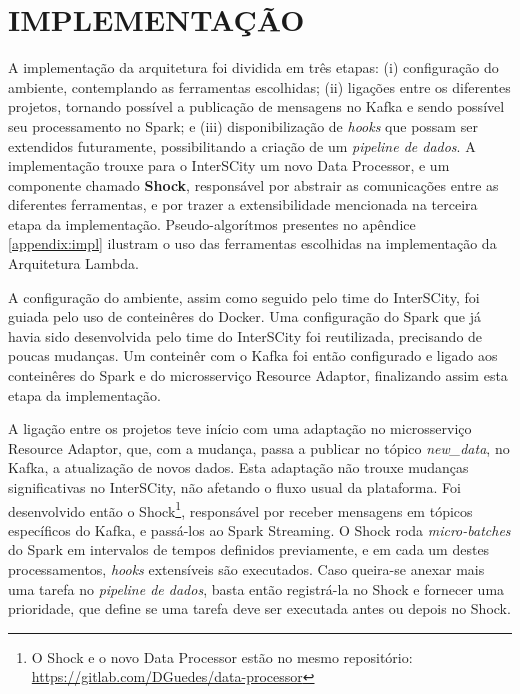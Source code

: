 \section{IMPLEMENTAÇÃO}

A implementação da arquitetura foi dividida em três etapas: (i)
configuração do ambiente, contemplando as ferramentas escolhidas; (ii)
ligações entre os diferentes projetos, tornando possível a publicação de
mensagens no Kafka e sendo possível seu processamento no Spark; e (iii)
disponibilização de \textit{hooks} que possam ser extendidos futuramente,
possibilitando a criação de um \textit{pipeline de dados}. A implementação
trouxe para o InterSCity um novo Data Processor, e um componente chamado
\textbf{Shock}, responsável por abstrair as comunicações entre as diferentes
ferramentas, e por trazer a extensibilidade mencionada na terceira etapa da
implementação. Pseudo-algorítmos presentes no apêndice \ref{appendix:impl}
ilustram o uso das ferramentas escolhidas na implementação da Arquitetura
Lambda.

A configuração do ambiente, assim como seguido pelo time do InterSCity, foi
guiada pelo uso de conteinêres do Docker. Uma configuração do Spark
que já havia sido desenvolvida pelo time do InterSCity foi reutilizada,
precisando de poucas mudanças. Um conteinêr com o Kafka foi então configurado e
ligado aos conteinêres do Spark e do microsserviço Resource Adaptor, finalizando
assim esta etapa da implementação.

A ligação entre os projetos teve início com uma adaptação no microsserviço
Resource Adaptor, que, com a mudança, passa a publicar no tópico
\textit{new\_data}, no Kafka, a atualização de novos dados. Esta
adaptação não trouxe mudanças significativas no InterSCity, não afetando o
fluxo usual da plataforma. Foi desenvolvido então o Shock\footnote{O Shock e o
novo Data Processor estão no mesmo repositório: \url{https://gitlab.com/DGuedes/data-processor}
}, responsável por receber mensagens em tópicos específicos do Kafka, e
passá-los ao Spark Streaming. O Shock roda \textit{micro-batches} do Spark em
intervalos de tempos definidos previamente, e em cada um destes processamentos,
\textit{hooks} extensíveis são executados. Caso queira-se anexar mais uma
tarefa no \textit{pipeline de dados}, basta então registrá-la no Shock e
fornecer uma prioridade, que define se uma tarefa deve ser executada antes ou
depois no Shock.
